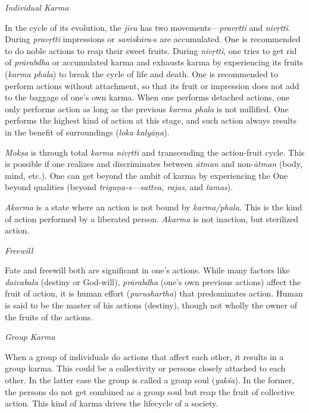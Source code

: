 \noindent
\textit{Individual Karma} 

In the cycle of its evolution, the \textit{jīva} has two movements—\textit{pravṛtti} and \textit{nivṛtti}. During \textit{pravṛtti} impressions or \textit{saṁskāra}-s are accumulated. One is recommended to do noble actions to reap their sweet fruits. During \textit{nivṛtti}, one tries to get rid of \textit{prārabdha} or accumulated karma and exhausts karma by experiencing its fruits (\textit{karma phala}) to break the cycle of life and death. One is recommended to perform actions without attachment, so that its fruit or impression does not add to the baggage of one's own karma. When one performs detached actions, one only performs action as long as the previous \textit{karma phala} is not nullified. One performs the highest kind of action at this stage, and such action always results in the benefit of surroundings (\textit{loka kalyāṇa}). 

\textit{Mokṣa} is through total \textit{karma nivṛtti} and transcending the action-fruit cycle. This is possible if one realizes and discriminates between \textit{ātman} and non-\textit{ātman} (body, mind, etc.). One can get beyond the ambit of karma by experiencing the One beyond qualities (beyond \textit{triguṇa-s—sattva, rajas}, and \textit{tamas}).

\textit{Akarma} is a state where an action is not bound by \textit{karma/phala}. This is the kind of action performed by a liberated person. \textit{Akarma} is not inaction, but sterilized action.

\noindent
\textit{Freewill} 

Fate and freewill both are significant in one's actions. While many factors like \textit{daivabala} (destiny or God-will), \textit{prārabdha} (one's own previous actions) affect the fruit of action, it is human effort (\textit{purushartha}) that predominates action. Human is said to be the master of his actions (destiny), though not wholly the owner of the fruits of the actions.

\noindent
\textit{Group Karma} 

When a group of individuals do actions that affect each other, it results in a group karma. This could be a collectivity or persons closely attached to each other. In the latter case the group is called a group soul (\textit{yakśa}). In the former, the persons do not get combined as a group soul but reap the fruit of collective action. This kind of karma drives the lifecycle of a society.

